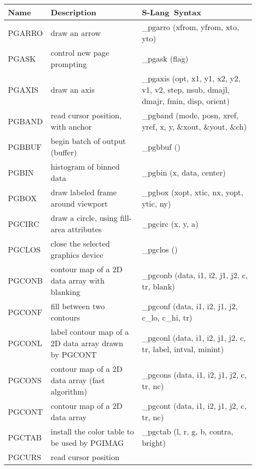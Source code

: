 \documentclass{book}
\newcommand{\slang}{{\sc S-Lang}}
\begin{document}
{\begin{center}
\begin{tabular}{|l|p{2.5in}|p{2.25in}|}
\hline
Name &  Description & \slang\ Syntax \\
\hline
\hline
PGARRO & draw an arrow                                                  &
\_pgarro (xfrom, yfrom, xto, yto) \\
PGASK & control new page prompting                                      &
\_pgask (flag) \\
PGAXIS & draw an axis                                                   &
\_pgaxis (opt, x1, y1, x2, y2, v1, v2, step, nsub, dmajl, dmajr, fmin, disp, orient) \\
PGBAND & read cursor position, with anchor                                 &
\_pgband (mode, posn, xref, yref, x, y, \&xout, \&yout, \&ch) \\
PGBBUF & begin batch of output (buffer)                                 &
\_pgbbuf () \\
PGBIN & histogram of binned data                                        &
\_pgbin (x, data, center) \\
PGBOX & draw labeled frame around viewport                              &
\_pgbox (xopt, xtic, nx, yopt, ytic, ny) \\
PGCIRC & draw a circle, using fill-area attributes                      &
\_pgcirc (x, y, a) \\
PGCLOS & close the selected graphics device                             &
\_pgclos () \\
PGCONB & contour map of a 2D data array with blanking      &
\_pgconb (data, i1, i2, j1, j2, c, tr, blank) \\
PGCONF & fill between two contours                                      &
\_pgconf (data, i1, i2, j1, j2, c\_lo, c\_hi, tr) \\
PGCONL & label contour map of a 2D data array drawn by PGCONT       &
\_pgconl (data, i1, i2, j1, j2, c, tr, label, intval, minint) \\
PGCONS & contour map of a 2D data array  (fast algorithm)       &
\_pgcons (data, i1, i2, j1, j2, c, tr, nc) \\
PGCONT & contour map of a 2D data array                                 &
\_pgcont (data, i1, i2, j1, j2, c, tr, nc) \\
PGCTAB & install the color table to be used by PGIMAG            &
\_pgctab (l, r, g, b, contra, bright) \\
PGCURS & read cursor position                                              &

\end{tabular}
\end{center}}
\end{document}
